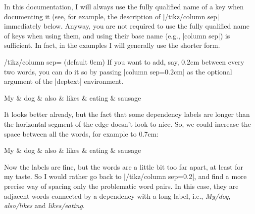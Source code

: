 \documentclass[a4paper]{ltxdoc}
\begin{document}
In this documentation, I will always use the fully qualified name of a key when documenting it (see, for example, the description of |/tikz/column sep| immediately below. Anyway, you are not required to use the fully qualified name of keys when using them, and using their base name (e.g., |column sep|) is sufficient. In fact, in the examples I will generally use the shorter form. 

\begin{key}{/tikz/column sep= (default 0cm)}
If you want to add, say, 0.2cm between every two words, you can do it so by passing |column sep=0.2cm| as the optional argument of the |deptext| environment.

\begin{codeexample}[]
\begin{dependency}
   \begin{deptext}[column sep=0.2cm]
      My \& dog \& also \& likes \& eating \& sausage \\
   \end{deptext}
\end{dependency}
\end{codeexample}

It looks better already, but the fact that some dependency labels are longer than the horizontal segment of the edge doesn't look to nice. So, we could increase the space between all the words, for example to 0.7cm:

\begin{codeexample}[]
\begin{dependency}
   \begin{deptext}[column sep=0.7cm]
      My \& dog \& also \& likes \& eating \& sausage \\
   \end{deptext}
\end{dependency}
\end{codeexample}

\end{key}

Now the labels are fine, but the words are a little bit too far apart, at least for my taste. So I would rather go back to |/tikz/column sep=0.2|, and find a more precise way of spacing only the problematic word pairs. In this case, they are adjacent words connected by a dependency with a long label, i.e., \emph{My/dog}, \emph{also/likes} and \emph{likes/eating}.
\end{document}
